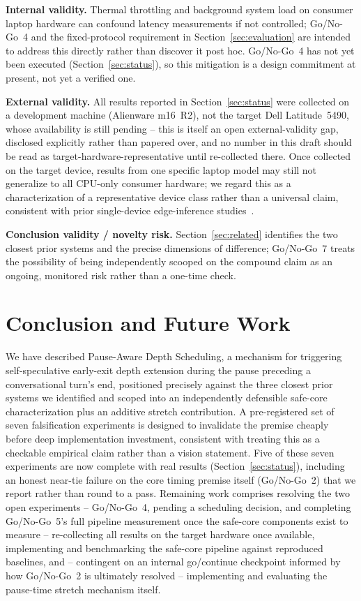 \documentclass[journal]{IEEEtran}
\begin{document}
\textbf{Internal validity.} Thermal throttling and background system load on consumer laptop hardware can confound latency measurements if not controlled; Go/No-Go~4 and the fixed-protocol requirement in Section~\ref{sec:evaluation} are intended to address this directly rather than discover it post hoc. Go/No-Go~4 has not yet been executed (Section~\ref{sec:status}), so this mitigation is a design commitment at present, not yet a verified one.

\textbf{External validity.} All results reported in Section~\ref{sec:status} were collected on a development machine (Alienware m16~R2), not the target Dell Latitude~5490, whose availability is still pending -- this is itself an open external-validity gap, disclosed explicitly rather than papered over, and no number in this draft should be read as target-hardware-representative until re-collected there. Once collected on the target device, results from one specific laptop model may still not generalize to all CPU-only consumer hardware; we regard this as a characterization of a representative device class rather than a universal claim, consistent with prior single-device edge-inference studies~\cite{venkatesha2025edgecloud}.

\textbf{Conclusion validity / novelty risk.} Section~\ref{sec:related} identifies the two closest prior systems and the precise dimensions of difference; Go/No-Go~7 treats the possibility of being independently scooped on the compound claim as an ongoing, monitored risk rather than a one-time check.

\section{Conclusion and Future Work}

We have described Pause-Aware Depth Scheduling, a mechanism for triggering self-speculative early-exit depth extension during the pause preceding a conversational turn's end, positioned precisely against the three closest prior systems we identified and scoped into an independently defensible safe-core characterization plus an additive stretch contribution. A pre-registered set of seven falsification experiments is designed to invalidate the premise cheaply before deep implementation investment, consistent with treating this as a checkable empirical claim rather than a vision statement. Five of these seven experiments are now complete with real results (Section~\ref{sec:status}), including an honest near-tie failure on the core timing premise itself (Go/No-Go~2) that we report rather than round to a pass. Remaining work comprises resolving the two open experiments -- Go/No-Go~4, pending a scheduling decision, and completing Go/No-Go~5's full pipeline measurement once the safe-core components exist to measure -- re-collecting all results on the target hardware once available, implementing and benchmarking the safe-core pipeline against reproduced baselines, and -- contingent on an internal go/continue checkpoint informed by how Go/No-Go~2 is ultimately resolved -- implementing and evaluating the pause-time stretch mechanism itself.
\end{document}
